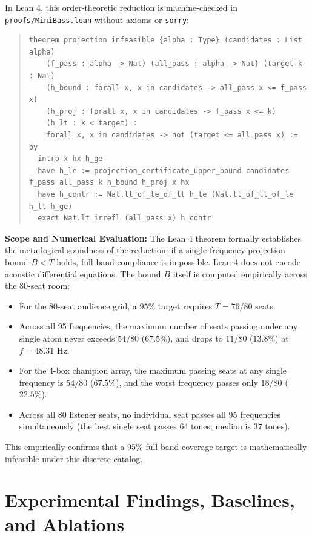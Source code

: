 \documentclass[11pt,a4paper]{article}
\begin{document}
In Lean 4, this order-theoretic reduction is machine-checked in \texttt{proofs/MiniBass.lean} without axioms or \texttt{sorry}:
\begin{quote}
\small
\begin{verbatim}
theorem projection_infeasible {alpha : Type} (candidates : List alpha)
    (f_pass : alpha -> Nat) (all_pass : alpha -> Nat) (target k : Nat)
    (h_bound : forall x, x in candidates -> all_pass x <= f_pass x)
    (h_proj : forall x, x in candidates -> f_pass x <= k)
    (h_lt : k < target) :
    forall x, x in candidates -> not (target <= all_pass x) := by
  intro x hx h_ge
  have h_le := projection_certificate_upper_bound candidates f_pass all_pass k h_bound h_proj x hx
  have h_contr := Nat.lt_of_le_of_lt h_le (Nat.lt_of_lt_of_le h_lt h_ge)
  exact Nat.lt_irrefl (all_pass x) h_contr
\end{verbatim}
\end{quote}

\noindent \textbf{Scope and Numerical Evaluation:} The Lean 4 theorem formally establishes the meta-logical soundness of the reduction: if a single-frequency projection bound $B < T$ holds, full-band compliance is impossible. Lean 4 does not encode acoustic differential equations. The bound $B$ itself is computed empirically across the 80-seat room:
\begin{itemize}
    \item For the 80-seat audience grid, a $95\%$ target requires $T = 76 / 80$ seats.
    \item Across all 95 frequencies, the maximum number of seats passing under any single atom never exceeds $54 / 80$ ($67.5\%$), and drops to $11 / 80$ ($13.8\%$) at $f = 48.31\text{ Hz}$.
    \item For the 4-box champion array, the maximum passing seats at any single frequency is $54 / 80$ ($67.5\%$), and the worst frequency passes only $18 / 80$ ($22.5\%$).
    \item Across all 80 listener seats, no individual seat passes all 95 frequencies simultaneously (the best single seat passes 64 tones; median is 37 tones).
\end{itemize}
This empirically confirms that a 95\% full-band coverage target is mathematically infeasible under this discrete catalog.

\section{Experimental Findings, Baselines, and Ablations}
\end{document}
